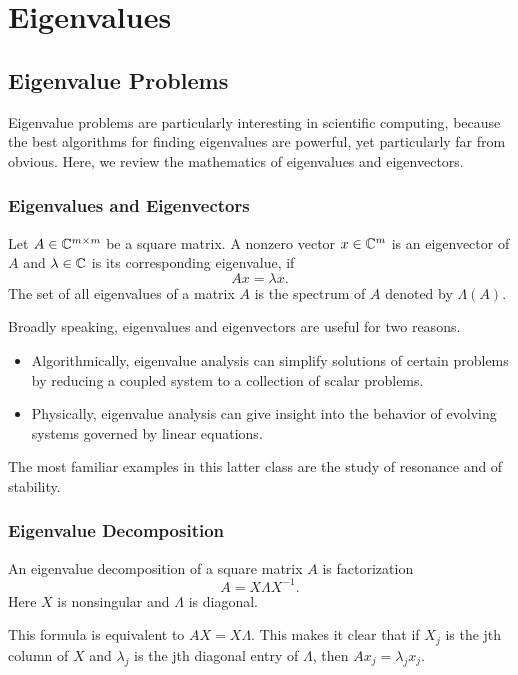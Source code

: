 \part{Eigenvalues} 
\chapter{Eigenvalue Problems}

Eigenvalue problems are particularly interesting in scientific computing, because the best algorithms for finding eigenvalues are powerful, yet particularly far from obvious. Here, we review the mathematics of eigenvalues and eigenvectors. 


\section{Eigenvalues and Eigenvectors}

\begin{definition}
\label{def: Eigenvalues and eigenvectors}
Let $ A \in \mathbb{C}^{ m \times m  }  $ be a square matrix. A nonzero vector $x\in \mathbb{C}^m$ is an eigenvector of $A$ and $ \lambda \in \mathbb{C} $ is its corresponding eigenvalue, if 
\[
Ax = \lambda x.          
\] 
The set of all eigenvalues of a matrix $ A $ is the spectrum of $A$ denoted by $ \Lambda (A) $.    
\end{definition}
Broadly speaking, eigenvalues and eigenvectors are useful for two reasons. 
\begin{itemize}
    \item Algorithmically, eigenvalue analysis can simplify solutions of certain problems by reducing a coupled system to a collection of scalar problems. 
    \item Physically, eigenvalue analysis can give insight into the behavior of evolving systems governed by linear equations. 
\end{itemize}

The most familiar examples in this latter class are the study of resonance and of stability. 

\section{Eigenvalue Decomposition} 

\begin{definition}
\label{def: Eigenvalue Decomposition}
An eigenvalue decomposition of a square matrix $A$ is factorization 
\[
A = X\Lambda X ^{-1} .   
\]      
Here $X$ is nonsingular and $\Lambda $ is diagonal. 
\end{definition}
This formula is equivalent to $AX= X\Lambda $. This makes it clear that if $X_j$ is the jth column of $ X $ and $ \lambda _j $ is the jth diagonal entry of $ \Lambda $, then $Ax_j = \lambda _jx_j$.    

